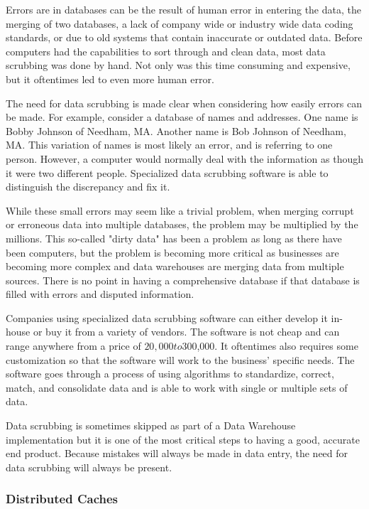 \documentclass[12pt]{article}
\begin{document}
Errors are in databases can be the result of human error in entering the data, the merging of two databases, a lack of company wide or industry wide data coding standards, or due to old systems that contain inaccurate or outdated data. Before computers had the capabilities to sort through and clean data, most data scrubbing was done by hand. Not only was this time consuming and expensive, but it oftentimes led to even more human error.

The need for data scrubbing is made clear when considering how easily errors can be made. For example, consider a database of names and addresses. One name is Bobby Johnson of Needham, MA. Another name is Bob Johnson of Needham, MA. This variation of names is most likely an error, and is referring to one person. However, a computer would normally deal with the information as though it were two different people. Specialized data scrubbing software is able to distinguish the discrepancy and fix it.

While these small errors may seem like a trivial problem, when merging corrupt or erroneous data into multiple databases, the problem may be multiplied by the millions. This so-called "dirty data" has been a problem as long as there have been computers, but the problem is becoming more critical as businesses are becoming more complex and data warehouses are merging data from multiple sources. There is no point in having a comprehensive database if that database is filled with errors and disputed information.

Companies using specialized data scrubbing software can either develop it in-house or buy it from a variety of vendors. The software is not cheap and can range anywhere from a price of $20,000 to $300,000. It oftentimes also requires some customization so that the software will work to the business' specific needs. The software goes through a process of using algorithms to standardize, correct, match, and consolidate data and is able to work with single or multiple sets of data.

Data scrubbing is sometimes skipped as part of a Data Warehouse implementation but it is one of the most critical steps to having a good, accurate end product. Because mistakes will always be made in data entry, the need for data scrubbing will always be present.


\subsubsection{Distributed Caches}
\end{document}

